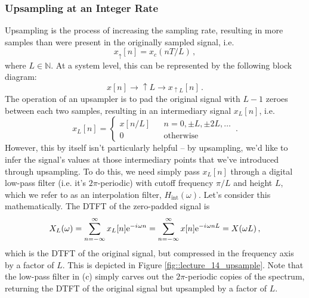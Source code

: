 \subsubsection{Upsampling at an Integer Rate}
%
Upsampling is the process of increasing the sampling rate, resulting in more samples
than were present in the originally sampled signal, i.e.
%
\begin{displaymath}
  x_\uparrow[n] = x_c(nT/L) \,,
\end{displaymath}
%
where $L\in\mathbb{N}$. At a system level, this can be represented
by the following block diagram:
%
\begin{displaymath}
  x[n] \longrightarrow \boxed{\uparrow L} \longrightarrow x_{\uparrow L}[n] \,.
\end{displaymath}
%
The operation of an upsampler is to pad the original signal with $L-1$ zeroes
between each two samples, resulting in an intermediary signal $x_L[n]$, i.e.
%
\begin{displaymath}
  x_{L}[n] = \left\{\begin{array}{ccl}
  x[n/L] & & n = 0, \pm L, \pm 2L, \hdots \\
  0 & & \mathrm{otherwise}
  \end{array}\right. \,.
\end{displaymath}
%
However, this by itself isn't particularly helpful -- by upsampling, we'd like
to infer the signal's values at those intermediary points that we've introduced
through upsampling. To do this, we need simply pass $x_L[n]$ through a digital
low-pass filter (i.e. it's $2\pi$-periodic) with cutoff frequency $\pi/L$ and height
$L$, which we refer to as an \textrm{interpolation filter}, $H_\mathrm{int}(\omega)$.
Let's consider this mathematically. The DTFT of the zero-padded signal is
%
\begin{displaymath}
  X_L(\omega) = \sum_{n=-\infty}^\infty x_L[n] \mathrm{e}^{-{i\mkern1mu}\omega n} = \sum_{n=-\infty}^\infty x[n]\mathrm{e}^{-{i\mkern1mu}\omega n L}
  = X(\omega L) \,,
\end{displaymath}
%
which is the DTFT of the original signal, but compressed in the frequency axis
by a factor of $L$. This is depicted in Figure \ref{fig::lecture_14_upsample}. Note
that the low-pass filter in (c) simply carves out the $2\pi$-periodic copies of
the spectrum, returning the DTFT of the original signal but upsampled by a factor
of $L$.
%

